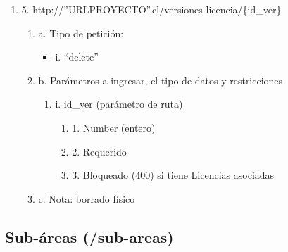 \begin{enumerate}
    \item 5. http://”URLPROYECTO”.cl/versiones-licencia/\{id\_ver\}
    \begin{enumerate}
        \item a. Tipo de petición:
            \begin{itemize}
               \item i. “delete”
            \end{itemize}
        \item b. Parámetros a ingresar, el tipo de datos y restricciones
            \begin{enumerate}
                \item i. id\_ver (parámetro de ruta)
                    \begin{enumerate}
                        \item 1. Number (entero)
                        \item 2. Requerido
                        \item 3. Bloqueado (400) si tiene Licencias asociadas
                    \end{enumerate}
            \end{enumerate}
        \item c. Nota: borrado físico
    \end{enumerate}
\end{enumerate}

\subsection{Sub-áreas (/sub-areas)}

